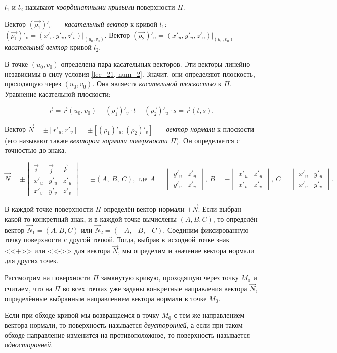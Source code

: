 \documentclass[../../main.tex]{subfiles}
\begin{document}
$l_1$ и $l_2$ называют \emph{координатными кривыми} поверхности $\Pi$.

Вектор $(\vec{\rho_1})'_v$~--- \emph{касательный вектор} к кривой $l_1$:
$(\vec{\rho_1})'_v = (x'_v, y'_v, z'_v) \Big|_{(u_0,v_0)}.$
Вектор $(\vec{\rho_2})'_u = (x'_u, y'_u, z'_u) \Big|_{(u_0,v_0)}$~--- 
\emph{касательный вектор} кривой $l_2$. 

В точке $(u_0, v_0)$ определена пара касательных векторов.
Эти векторы линейно независимы в силу условия \eqref{lec_21, num_2}. 
Значит, они определяют плоскость, проходящую через $(u_0,v_0)$.
Она являестя \emph{касательной плоскостью} к $\Pi$. 
Уравнение касательной плоскости:

\[\vec{r} = \vec{r}(u_0,v_0) + (\vec{\rho_1})'_v \cdot t +
(\vec{\rho_2})'_u \cdot s = 
\vec{r}(t,s)
.\]

Вектор $\vec{N} = \pm \left[ r'_u, r'_v \right] = 
\pm \left[ (\rho_1)'_u, (\rho_2)'_v  \right]$~--- 
\emph{вектор нормали} к плоскости 
(его называют также \emph{вектором нормали поверхности} $\Pi$).
Он определяется с точностью до знака.

\[
\vec{N} = 
\pm \begin{vmatrix}
\vec{i} & \vec{j} & \vec{k} \\
x'_u & y'_u & z'_u \\
x'_v & y'_v & z'_v
\end{vmatrix} = 
\pm (A,\ B,\ C)
, \text{ где } A = \begin{vmatrix}
y'_u & z'_u \\
 y'_v & z'_v
\end{vmatrix},\ 
B = -\begin{vmatrix}
x'_u & z'_u \\
x'_v & z'_v
\end{vmatrix},\
C = \begin{vmatrix}
x'_u & y'_u \\
x'_v & y'_v
\end{vmatrix}
.\]

В каждой точке поверхности $\Pi$ определён вектор нормали $\pm \vec{N}$.
Если выбран какой-то конкретный знак, и в каждой точке вычислены
$(A, B, C)$, то определён вектор $\vec{N}_1 = (A, B, C)$ или
$\vec{N}_2 = (-A, -B, -C)$.
Соединим фиксированную точку поверхности с другой точкой.
Тогда, выбрав в исходной точке знак <<+>> или <<->> для вектора $\vec{N}$,
мы определим и значение вектора нормали для других точек.

Рассмотрим на поверхности $\Pi$ замкнутую кривую, 
проходящую через точку $M_0$ и
считаем, что на $\Pi$ во всех точках уже заданы конкретные направления
вектора $\vec{N}$, определённые выбранным направлением вектора нормали в точке 
$M_0$. 

Если при обходе кривой мы возвращаемся в точку $M_0$ с тем же
направлением вектора нормали, то поверхность называется \emph{двусторонней},
а если при таком обходе направление изменится на противоположное,
то поверхность называется \emph{односторонней}.
\end{document}
